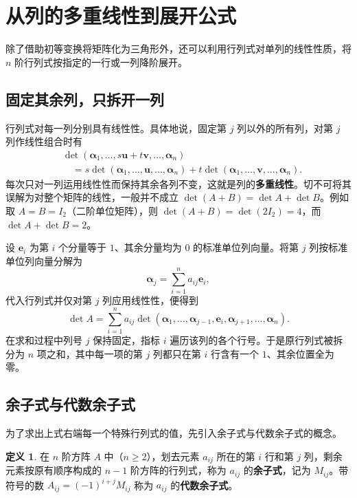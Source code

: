 \documentclass[UTF8, fontset=fandol, a4paper, 12pt]{ctexart}
\theoremstyle{definition}
\newtheorem{definition}[theorem]{定义}
\begin{document}
\section{从列的多重线性到展开公式}

除了借助初等变换将矩阵化为三角形外，还可以利用行列式对单列的线性性质，将 $n$ 阶行列式按指定的一行或一列降阶展开。

\subsection{固定其余列，只拆开一列}

行列式对每一列分别具有线性性。具体地说，固定第 $j$ 列以外的所有列，对第 $j$ 列作线性组合时有
\begin{align*}
 &\det(\boldsymbol\alpha_1,\ldots,s\boldsymbol u+t\boldsymbol v,\ldots,\boldsymbol\alpha_n)\\
 &\quad=s\det(\boldsymbol\alpha_1,\ldots,\boldsymbol u,\ldots,\boldsymbol\alpha_n)
       +t\det(\boldsymbol\alpha_1,\ldots,\boldsymbol v,\ldots,\boldsymbol\alpha_n).
\end{align*}
每次只对一列运用线性性而保持其余各列不变，这就是列的\textbf{多重线性}。切不可将其误解为对整个矩阵的线性，一般并不成立 $\det(A+B)=\det A+\det B$。例如取 $A=B=I_2$（二阶单位矩阵），则 $\det(A+B)=\det(2I_2)=4$，而 $\det A+\det B=2$。

设 $\boldsymbol e_i$ 为第 $i$ 个分量等于 $1$、其余分量均为 $0$ 的标准单位列向量。将第 $j$ 列按标准单位列向量分解为
\[
 \boldsymbol\alpha_j=\sum_{i=1}^n a_{ij}\boldsymbol e_i,
\]
代入行列式并仅对第 $j$ 列应用线性性，便得到
\[
 \det A=\sum_{i=1}^n a_{ij}
 \det(\boldsymbol\alpha_1,\ldots,\boldsymbol\alpha_{j-1},
       \boldsymbol e_i,\boldsymbol\alpha_{j+1},\ldots,\boldsymbol\alpha_n).
\]
在求和过程中列号 $j$ 保持固定，指标 $i$ 遍历该列的各个行号。于是原行列式被拆分为 $n$ 项之和，其中每一项的第 $j$ 列都只在第 $i$ 行含有一个 $1$、其余位置全为零。

\subsection{余子式与代数余子式}

为了求出上式右端每一个特殊行列式的值，先引入余子式与代数余子式的概念。

\begin{definition}
在 $n$ 阶方阵 $A$ 中（$n\ge2$），划去元素 $a_{ij}$ 所在的第 $i$ 行和第 $j$ 列，剩余元素按原有顺序构成的 $n-1$ 阶方阵的行列式，称为 $a_{ij}$ 的\textbf{余子式}，记为 $M_{ij}$。带符号的数 $A_{ij}=(-1)^{i+j}M_{ij}$ 称为 $a_{ij}$ 的\textbf{代数余子式}。
\end{definition}
\end{document}
